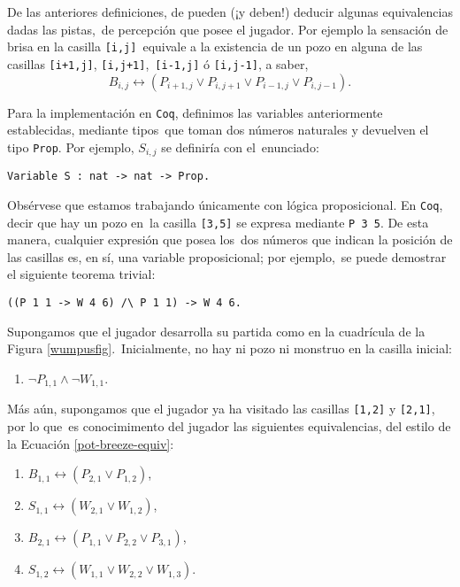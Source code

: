 \documentclass[paper=letter, fontsize=12pt]{scrartcl}
\begin{document}
De las anteriores definiciones, de pueden (¡y deben!) deducir algunas equivalencias dadas las pistas,\
de percepción que posee el jugador. Por ejemplo la sensación de brisa en la casilla \verb+[i,j]+\
equivale a la existencia de un pozo en alguna de las casillas \verb_[i+1,j]_, \verb_[i,j+1]_,\
\verb_[i-1,j]_ ó \verb_[i,j-1]_, a saber,
\begin{equation}
  B_{i,j} \leftrightarrow (P_{i+1,j} \vee P_{i,j+1} \vee P_{i-1,j} \vee P_{i,j-1}).\label{pot-breeze-equiv}
\end{equation}\par
Para la implementación en \verb+Coq+, definimos las variables anteriormente establecidas, mediante tipos\
que toman dos números naturales y devuelven el tipo \verb+Prop+. Por ejemplo, $S_{i,j}$ se definiría con el\
enunciado:
\begin{verbatim}
Variable S : nat -> nat -> Prop.
\end{verbatim}\par
Obsérvese que estamos trabajando únicamente con lógica proposicional. En \verb+Coq+, decir que hay un pozo en\
la casilla \verb+[3,5]+ se expresa mediante \verb+P 3 5+. De esta manera, cualquier expresión que posea los\
dos números que indican la posición de las casillas es, en sí, una variable proposicional; por ejemplo,\
se puede demostrar el siguiente teorema trivial:
\begin{verbatim}
((P 1 1 -> W 4 6) /\ P 1 1) -> W 4 6.
\end{verbatim}\par
Supongamos que el jugador desarrolla su partida como en la cuadrícula de la Figura \ref{wumpusfig}.\
Inicialmente, no hay ni pozo ni monstruo en la casilla inicial:
\begin{enumerate}[label=H\arabic*]
\item $\neg P_{1,1} \wedge \neg W_{1,1}$.
\end{enumerate}\par
Más aún, supongamos que el jugador ya ha visitado las casillas \verb+[1,2]+ y \verb+[2,1]+, por lo que\
es conocimimento del jugador las siguientes equivalencias, del estilo de la Ecuación \ref{pot-breeze-equiv}:
\begin{enumerate}[label=H\arabic*, resume]
\item $B_{1,1} \leftrightarrow (P_{2,1} \vee P_{1,2})$,
\item $S_{1,1} \leftrightarrow (W_{2,1} \vee W_{1,2})$,
\item $B_{2,1} \leftrightarrow (P_{1,1} \vee P_{2,2} \vee P_{3,1})$,
\item $S_{1,2} \leftrightarrow (W_{1,1} \vee W_{2,2} \vee W_{1,3})$.
\end{enumerate}\par
\end{document}
